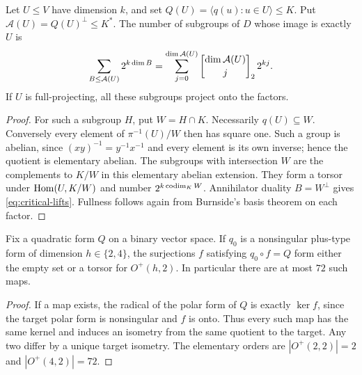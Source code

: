 \begin{lemma}\label{lem:critical-lifts}
Let $U\leq V$ have dimension $k$, and set
$Q(U)=\langle q(u):u\in U\rangle\leq K$. Put
$\mathcal A(U)=Q(U)^\perp\leq K^*$. The number of subgroups of $D$
whose image is exactly $U$ is
\begin{equation}\label{eq:critical-lifts}
 \sum_{B\leq\mathcal A(U)}2^{k\dim B}
 =\sum_{j=0}^{\dim\mathcal A(U)}
       \gauss{\dim\mathcal A(U)}j2\,2^{kj}.
\end{equation}
If $U$ is full-projecting, all these subgroups project onto the factors.
\end{lemma}
\begin{proof}
For such a subgroup $H$, put $W=H\cap K$. Necessarily $q(U)\subseteq W$.
Conversely every element of $\pi^{-1}(U)/W$ then has square one.
Such a group is abelian, since $(xy)^{-1}=y^{-1}x^{-1}$ and every
element is its own inverse; hence the quotient is elementary abelian.
The subgroups with intersection $W$ are the complements to $K/W$ in
this elementary abelian extension. They form a torsor under
$\operatorname{Hom}(U,K/W)$ and number $2^{k\operatorname{codim}_K W}$. Annihilator duality
$B=W^\perp$ gives \eqref{eq:critical-lifts}.
Fullness follows again from Burnside's basis theorem on each factor.
\end{proof}

\begin{lemma}\label{lem:quadratic}
Fix a quadratic form $Q$ on a binary vector space. If $q_0$ is a
nonsingular plus-type form of dimension $h\in\{2,4\}$, the surjections
$f$ satisfying $q_0\circ f=Q$ form either the empty set or a torsor for
$O^+(h,2)$. In particular there are at most $72$ such maps.
\end{lemma}
\begin{proof}
If a map exists, the radical of the polar form of $Q$ is exactly
$\ker f$, since the target polar form is nonsingular and $f$ is onto.
Thus every such map has the same kernel and induces an isometry from
the same quotient to the target. Any two differ by a unique target
isometry. The elementary orders are $|O^+(2,2)|=2$ and
$|O^+(4,2)|=72$.
\end{proof}

